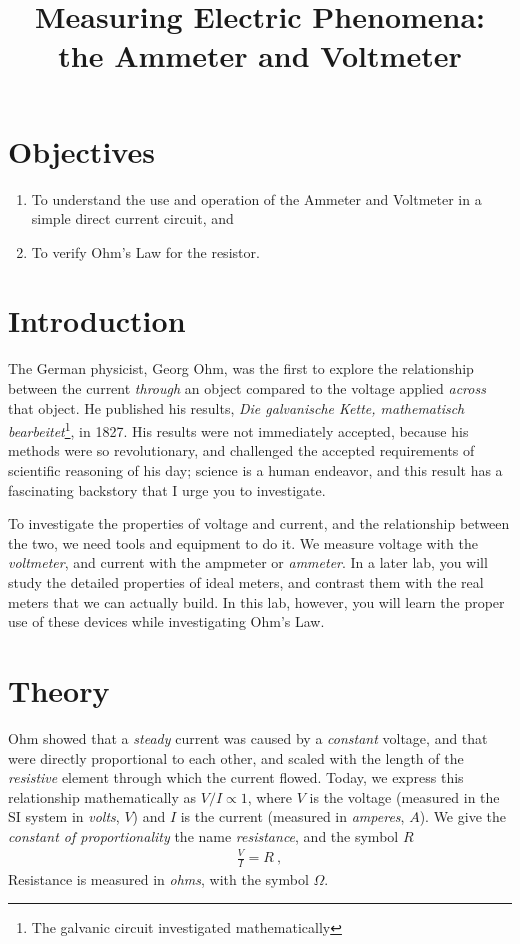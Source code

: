 \documentclass[12pt]{article}
\title{Measuring Electric Phenomena:\\the Ammeter and Voltmeter}
\date{}
\begin{document}
\maketitle

\section{Objectives}
\label{sec:objectives}

\begin{enumerate}
\item To understand the use and operation of the Ammeter and
  Voltmeter in a simple direct current circuit, and
\item To verify Ohm's Law for the resistor.
\end{enumerate}

\section{Introduction}
\label{sec:introduction}

The German physicist, Georg Ohm, was the first to explore the
relationship between the current \textit{through} an object compared
to the voltage applied \textit{across} that object.  He published his
results, \textit{Die galvanische Kette, mathematisch
  bearbeitet}\footnote{The galvanic circuit investigated
  mathematically}, in 1827.  His results were not immediately
accepted, because his methods were so revolutionary, and challenged
the accepted requirements of scientific reasoning of his day; science
is a human endeavor, and this result has a fascinating backstory that
I urge you to investigate.

To investigate the properties of voltage and current, and the
relationship between the two, we need tools and equipment to do it.
We measure voltage with the \textit{voltmeter}, and current with the
ampmeter or \textit{ammeter}.  In a later lab, you will study the
detailed properties of ideal meters, and contrast them with the real
meters that we can actually build.  In this lab, however, you will
learn the proper use of these devices while investigating Ohm's Law.

\section{Theory}
\label{sec:theory}

Ohm showed that a \textit{steady} current was caused by a
\textit{constant} voltage, and that were directly proportional to each
other, and scaled with the length of the \textit{resistive} element
through which the current flowed.  Today, we express this relationship
mathematically as $V/I \propto 1$, where $V$ is the voltage (measured
in the SI system in \textit{volts}, $V$) and $I$ is the current
(measured in \textit{amperes}, $A$).  We give the \textit{constant of
  proportionality} the name \textit{resistance}, and the symbol $R$
\begin{gather*}
  \frac{V}{I} = R\ ,
\end{gather*}
Resistance is measured in \textit{ohms}, with the symbol $\Omega$.
\end{document}
